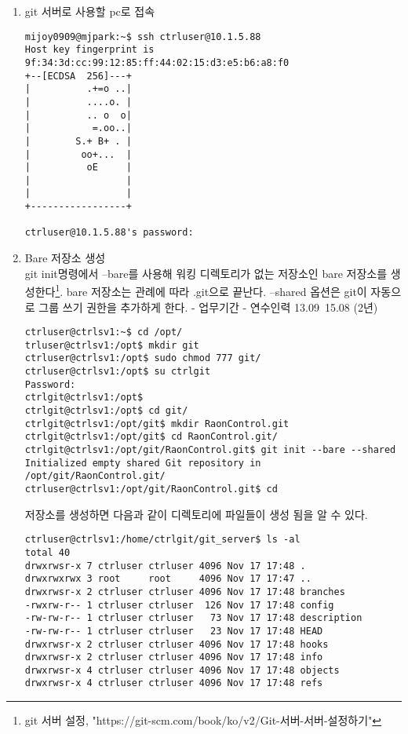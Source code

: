 \documentclass[11pt
  , a4paper
  , article
  , oneside
]{memoir}
\begin{document}
\begin{enumerate}
\item git 서버로 사용할 pc로 접속

\scriptsize
{
\begin{verbatim}
mijoy0909@mjpark:~$ ssh ctrluser@10.1.5.88
Host key fingerprint is 9f:34:3d:cc:99:12:85:ff:44:02:15:d3:e5:b6:a8:f0
+--[ECDSA  256]---+
|          .+=o ..|
|          ....o. |
|          .. o  o|
|           =.oo..|
|        S.+ B+ . |
|         oo+...  |
|          oE     |
|                 |
|                 |
+-----------------+

ctrluser@10.1.5.88's password: 
\end{verbatim}
}

\item Bare 저장소 생성\\
git init명령에서 --bare를 사용해 워킹 디렉토리가 없는 저장소인 bare 저장소를 생성한다\footnote{git 서버 설정, "https://git-scm.com/book/ko/v2/Git-서버-서버-설정하기"}. bare 저장소는 관례에 따라  .git으로 끝난다. --shared 옵션은 git이 자동으로 그룹 쓰기 권한을 추가하게 한다.  - 업무기간 
- 연수인력 13.09~15.08 (2년)

\scriptsize
{
\begin{verbatim}
ctrluser@ctrlsv1:~$ cd /opt/
trluser@ctrlsv1:/opt$ mkdir git
ctrluser@ctrlsv1:/opt$ sudo chmod 777 git/
ctrluser@ctrlsv1:/opt$ su ctrlgit
Password: 
ctrlgit@ctrlsv1:/opt$ 
ctrlgit@ctrlsv1:/opt$ cd git/
ctrlgit@ctrlsv1:/opt/git$ mkdir RaonControl.git
ctrlgit@ctrlsv1:/opt/git$ cd RaonControl.git/
ctrlgit@ctrlsv1:/opt/git/RaonControl.git$ git init --bare --shared
Initialized empty shared Git repository in /opt/git/RaonControl.git/
ctrluser@ctrlsv1:/opt/git/RaonControl.git$ cd
\end{verbatim}
}

저장소를 생성하면 다음과 같이 디렉토리에 파일들이 생성 됨을 알 수 있다.

\scriptsize
{
\begin{verbatim}
ctrluser@ctrlsv1:/home/ctrlgit/git_server$ ls -al
total 40
drwxrwsr-x 7 ctrluser ctrluser 4096 Nov 17 17:48 .
drwxrwxrwx 3 root     root     4096 Nov 17 17:47 ..
drwxrwsr-x 2 ctrluser ctrluser 4096 Nov 17 17:48 branches
-rwxrw-r-- 1 ctrluser ctrluser  126 Nov 17 17:48 config
-rw-rw-r-- 1 ctrluser ctrluser   73 Nov 17 17:48 description
-rw-rw-r-- 1 ctrluser ctrluser   23 Nov 17 17:48 HEAD
drwxrwsr-x 2 ctrluser ctrluser 4096 Nov 17 17:48 hooks
drwxrwsr-x 2 ctrluser ctrluser 4096 Nov 17 17:48 info
drwxrwsr-x 4 ctrluser ctrluser 4096 Nov 17 17:48 objects
drwxrwsr-x 4 ctrluser ctrluser 4096 Nov 17 17:48 refs
\end{verbatim}
}
\end{enumerate}
\end{document}
